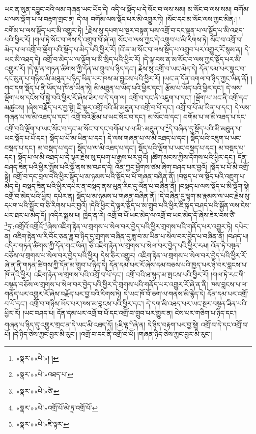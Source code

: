 ཡང་ན་སུན་དབྱུང་བའི་ལམ་གཞན་ཡང་ཡོད་དེ། འདི་ལ་སྡོད་པ་དེ་སོང་བ་ལས་སམ། མ་སོང་བ་ལས་སམ། བགོམ་པ་ལས་ལྡོག་པ་ལ་བརྟག་གྲང་ན། དེ་ལ། བགོམ་ལས་སྡོད་པར་མི་འགྱུར་ཏེ། །སོང་དང་མ་སོང་ལས་ཀྱང་མིན:། །བགོམ་པ་ལས་སྡོད་པར་མི་འགྱུར་ཏེ། \footnote{«སྣར་»«པེ་»། ། }རྗེས་སུ་དཔག་པ་སྔར་བསྟན་པས་འགྲོ་བ་དང་ལྡན་པ་ལ་སྡོད་པ་མི་འཐད་པའི་ཕྱིར་རོ། །གལ་ཏེ་སོང་བ་ལས་དེ་འགྲུབ་བོ་ཞེ་ན། སོང་བ་ལས་ཀྱང་དེ་འགྲུབ་པ་མི་རིགས་ཏེ། སོང་བ་འགྲོ་བ་མེད་པ་ལ་འགྲོ་བ་ལྡོག་པའི་སྡོད་པ་མེད་པའི་ཕྱིར་རོ། །འོ་ན་མ་སོང་བ་ལས་སྡོད་པ་འགྲུབ་པར་འགྱུར་རོ་སྙམ་ན། དེ་ཡང་མི་འཐད་དེ། འགྲོ་བ་མེད་པ་ལ་ལྡོག་པ་མི་སྲིད་པའི་ཕྱིར་རོ། །དེ་ལྟ་བས་ན་མ་སོང་བ་ལས་ཀྱང་སྡོད་པར་མི་འགྱུར་རོ། །དེ་ལྟ་ན་གཏན་ཚིགས་ཀྱི་དོན་མ་གྲུབ་པ་ཉིད་དང་། རྗེས་སུ་འགྲོ་བ་ཡང་མེད་དེ། དོན་དམ་པར་སྣང་བ་དང་མུན་པ་གཉིས་མི་མཐུན་པ་ཉིད་ཡིན་པར་ཁས་མ་བླངས་པའི་ཕྱིར་རོ། །ཡང་ན་དོན་འགལ་བ་ཉིད་ཀྱང་ཡིན་ནོ། །གང་དག་སྡོད་པ་ནི་ཡོད་པ་ཁོ་ན་ཡིན་ཏེ། མི་མཐུན་པ་ཡོད་པའི་ཕྱིར་དང་། རྩོམ་པ་ཡོད་པའི་ཕྱིར་དང་། དེ་ལས་ལྡོག་པས་དངོས་པོ་སྐྱེ་བའི་ཕྱིར་རོ་ཞེས་ཟེར་བ་དེ་དག་ལ། འགྲོ་བ་དང་ནི་འཇུག་པ་དང་། །ལྡོག་པ་ཡང་ནི་འགྲོ་དང་མཚུངས། །ཞེས་བརྗོད་པར་བྱ་སྟེ། ཇི་ལྟར་འགྲོ་བའི་མི་མཐུན་པ་འགྲོ་བ་པོ་དང་། འགྲོ་བ་པོ་མ་ཡིན་པ་དང་། དེ་ལས་གཞན་པ་ལ་མི་འཐད་པ་དང་། འགྲོ་བའི་རྩོམ་པ་ཡང་སོང་བ་དང་། མ་སོང་བ་དང་། བགོམ་པ་ལ་མི་འཐད་པ་དང་འགྲོ་བའི་ལྡོག་པ་ཡང་སོང་བ་དང་མ་སོང་བ་དང་བགོམ་པ་ལ་མི་:མཐུན་པ་\footnote{«སྣར་»«པེ་»འཐད་པ་}དེ་བཞིན་དུ་སྡོད་པའི་མི་མཐུན་པ་ཡང་སྡོད་པ་པོ་དང་། སྡོད་པ་པོ་མ་ཡིན་པ་དང་། དེ་ལས་གཞན་པ་ལ་མི་འཐད་པ་དང་། སྡོད་པའི་འཇུག་པ་ཡང་བསྡད་པ་དང་། མ་བསྡད་པ་དང་། སྡོད་པ་ལ་མི་འཐད་པ་དང་། སྡོད་པའི་ལྡོག་པ་ཡང་བསྡད་པ་དང་། མ་བསྡད་པ་དང་། སྡོད་པ་ལ་མི་འཐད་པ་དེ་ལྟར་རྗེས་སུ་དཔག་པ་རྒྱས་པར་བྱའོ། །ཚིག་མངས་ཀྱིས་དོགས་པའི་ཕྱིར་དང་། དོན་བཤད་ཟིན་པའི་ཕྱིར་སྤྲོས་པའི་སྒོ་ནས་མ་བཤད་དེ། འོན་ཀྱང་ཕྱོགས་ཙམ་ཞིག་བཤད་པར་བྱའོ། །སྡོད་པ་པོ་མི་འགྲོ་སྟེ། འགྲོ་བ་དང་བྲལ་བའི་ཕྱིར་སྡོད་པ་མ་ཉམས་པའི་སྡོད་པ་པོ་གཞན་བཞིན་ནོ། །བསྡད་པ་ལ་སྡོད་པའི་འཇུག་པ་མེད་དེ། བསྡད་ཟིན་པའི་ཕྱིར་དཔེར་ན་བསྡད་ནས་ཡུན་རིང་དུ་ལོན་པ་བཞིན་ནོ། །བསྡད་པ་ལས་སྡོད་པ་མི་ལྡོག་སྟེ། འགྲོ་བ་མེད་པའི་ཕྱིར། དཔེར་ན། སྡོད་པ་མ་ཉམས་པ་གཞན་བཞིན་ནོ། །དེ་བཞིན་དུ་ལྷག་མ་རྣམས་ལ་ཡང་རྗེས་སུ་དཔག་པའི་སྦྱོར་བ་ཅི་རིགས་པར་བྱའོ། །དེའི་ཕྱིར་དེ་ལྟར་སྡོད་པ་མ་གྲུབ་པའི་ཕྱིར་ཇི་སྐད་བཤད་པའི་སྐྱོན་ལས་ངེས་པར་ཐར་པ་མེད་དོ། །འདིར་སྨྲས་པ། ཁྱེད་ན་རེ། འགྲོ་བ་པོ་ཡང་མེད་ལ་འགྲོ་བ་ཡང་མེད་དོ་ཞེས་ཟེར་བས་ཙཻ་\footnote{«སྣར་»«པེ་»ཙེ་}ཏྲ་:འགྲོའོ་འགྲོའོ་\footnote{«སྣར་»«པེ་»འགྲོ་པོ་མེ་ཏྲ་འགྲོ་པོ་}ཞེས་འཇིག་རྟེན་ལ་གྲགས་པ་སེལ་བར་བྱེད་པའི་ཕྱིར་གྲགས་པའི་གནོད་པར་འགྱུར་ཏེ། དཔེར་ན། འཇིག་རྟེན་ལ་རི་བོང་ཅན་ཟླ་བ་ཉིད་དུ་གྲགས་བཞིན་དུ་ཟླ་བ་མ་ཡིན་པ་སེལ་བར་བྱེད་པ་བཞིན་ནོ། །བཤད་པ། འདིར་གཏན་ཚིགས་ཀྱི་དོན་གང་ཡིན། ཅི་འཇིག་རྟེན་ལ་གྲགས་པ་སེལ་བར་བྱེད་པའི་ཕྱིར་རམ། འོན་ཏེ་བསྟན་བཅོས་ལ་གྲགས་པ་སེལ་བར་བྱེད་པའི་ཕྱིར། དེས་ཅིར་འགྱུར། འཇིག་རྟེན་ལ་གྲགས་པ་སེལ་བར་བྱེད་པའི་ཕྱིར་རོ་ཞེ་ན་ནི་གཏན་ཚིགས་ཀྱི་དོན་མ་གྲུབ་པ་ཉིད་དེ། དོན་དམ་པར་རོ་ཞེས་དམ་བཅས་པའི་ཁྱད་པར་ཉེ་བར་བླངས་པ་ཁོ་ནའི་ཕྱིར། འཇིག་རྟེན་ལ་གྲགས་པའི་འགྲོ་བ་པོ་དང་། འགྲོ་བའི་ཐ་སྙད་མ་སྤངས་པའི་ཕྱིར་རོ། །གལ་ཏེ་རང་གི་བསྟན་བཅོས་ལ་གྲགས་པ་སེལ་བར་བྱེད་པའི་ཕྱིར་དེ་གྲགས་པའི་གནོད་པར་འགྱུར་རོ་ཞེ་ན་ནི། ཁས་བླངས་པ་ལ་གནོད་པར་འགྱུར་རོ་ཞེས་བརྗོད་པར་བྱ་བའི་རིགས་ཏེ། དེ་ཡང་ཁོ་བོ་ཅག་ལ་གནས་མི་རྙེད་དེ། དོན་དམ་པར་འགྲོ་བ་པོ་དང་། འགྲོ་བ་གཉིས་ཡོད་པར་ཁས་མ་བླངས་པའི་ཕྱིར་དང་། དེ་དག་མི་འཐད་པར་ཡང་སྔར་བསྟན་ཟིན་པའི་ཕྱིར་རོ། །ཡང་བཤད་པ། དོན་དམ་པར་འགྲོ་བ་པོ་དང་འགྲོ་བ་གྲུབ་པར་གྱུར་ན། ངེས་པར་གཅིག་པ་ཉིད་དང་། གཞན་པ་ཉིད་དུ་འགྱུར་གྲང་ན་དེ་ཡང་མི་འཐད་དོ། །:ཇི་ལྟ་\footnote{«སྣར་»«པེ་»ཇི་ལྟར་}ཞེ་ན། དེ་ཉིད་བརྟག་པར་བྱ་སྟེ། འགྲོ་བ་དེ་དང་འགྲོ་བ་པོ། །དེ་ཉིད་ཅེས་ཀྱང་བྱར་མི་རུང་། །འགྲོ་བ་དང་ནི་འགྲོ་བ་པོ། །གཞན་ཉིད་ཅེས་ཀྱང་བྱར་མི་རུང་། 